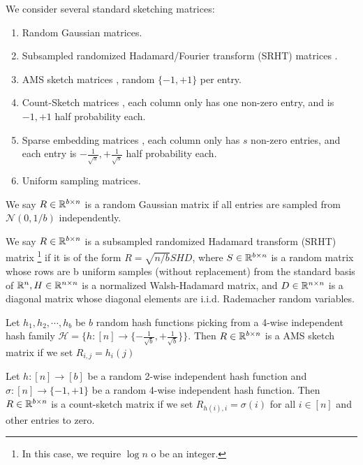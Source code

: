 We consider several standard sketching matrices:
\begin{enumerate}
    \item Random Gaussian matrices.
    \item Subsampled randomized Hadamard/Fourier transform (SRHT) matrices \cite{ldfu13}.
    \item AMS sketch matrices \cite{ams96}, random $\{-1,+1\}$ per entry.
    \item Count-Sketch matrices \cite{ccf02}, each column only has one non-zero entry, and is $-1,+1$ half probability each.
    \item Sparse embedding matrices \cite{nn13}, each column only has $s$ non-zero entries, and each entry is $-\frac{1}{\sqrt{s}},+\frac{1}{\sqrt{s}}$ half probability each.
    \item Uniform sampling matrices.
\end{enumerate}

\begin{definition}
    We say $R \in \mathbb{R}^{b \times n}$ is a random Gaussian matrix if all entries are sampled from $\mathcal{N}(0,1 / b)$ independently.
\end{definition}

\begin{definition}
    We say $R \in \mathbb{R}^{b \times n}$ is a subsampled randomized Hadamard transform (SRHT) matrix \footnote{ In this case, we require  $\log n$  o be an integer. } if it is of the form $R=\sqrt{n / b} S H D$, where $S \in \mathbb{R}^{b \times n}$ is a random matrix whose rows are b uniform samples (without replacement) from the standard basis of $\mathbb{R}^n, H \in \mathbb{R}^{n \times n}$ is a normalized Walsh-Hadamard matrix, and $D \in \mathbb{R}^{n \times n}$ is a diagonal matrix whose diagonal elements are i.i.d. Rademacher random variables.
\end{definition}

\begin{definition}
   Let $h_1, h_2, \cdots, h_b$ be $b$ random hash functions picking from a 4-wise independent hash family $\mathcal{H}=\{h:[n] \rightarrow\{-\frac{1}{\sqrt{b}},+\frac{1}{\sqrt{b}}\}\}$. Then $R \in \mathbb{R}^{b \times n}$ is a AMS sketch matrix if we set $R_{i, j}=h_i(j)$
\end{definition}

\begin{definition}
    Let $h:[n] \rightarrow[b]$ be a random 2-wise independent hash function and $\sigma:[n] \rightarrow\{-1,+1\}$ be a random 4-wise independent hash function. Then $R \in \mathbb{R}^{b \times n}$ is a count-sketch matrix if we set $R_{h(i), i}=\sigma(i)$ for all $i \in[n]$ and other entries to zero.
\end{definition}

